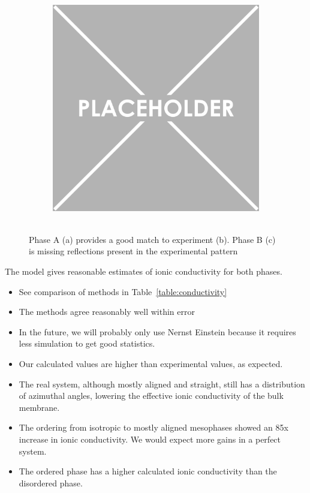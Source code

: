 \documentclass{article}
\begin{document}
\begin{itemize}
\begin{figure}
\begin{subfigure}{.3\textwidth}
		\caption{~\label{fig:xrdexp}}
	\end{subfigure}
        \begin{subfigure}{.3\textwidth}
                \centering
                \includegraphics[width=\linewidth]{placeholder.png}
                \caption{~\label{fig:xrdB}}
        \end{subfigure}
	\caption{Phase A (a) provides a good match to experiment (b). Phase B (c) is missing reflections present in the experimental pattern} %
	\label{fig:xrd}
	\end{figure}

	The model gives reasonable estimates of ionic conductivity for both phases.
	\begin{itemize}
		\item See comparison of methods in Table~\ref{table:conductivity}
		\item The methods agree reasonably well within error
		\item In the future, we will probably only use Nernst Einstein because it requires less simulation to get good statistics. %
		\item Our calculated values are higher than experimental values, as expected.
		\item The real system, although mostly aligned and straight, still has a distribution of azimuthal angles, lowering the effective ionic conductivity of the bulk membrane. 
		\item The ordering from isotropic to mostly aligned mesophases showed an 85x increase in ionic conductivity. We would expect more gains in a perfect system.
		\item The ordered phase has a higher calculated ionic conductivity than the disordered phase.
	\end{itemize}
	

\end{itemize}
\end{document}
